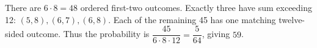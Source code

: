 There are $6\cdot8=48$ ordered first-two outcomes. Exactly three have sum exceeding 12: $(5,8),(6,7),(6,8)$. Each of the remaining 45 has one matching twelve-sided outcome. Thus the probability is $\dfrac{45}{6\cdot8\cdot12}=\dfrac{5}{64}$, giving $\boxed{59}$.

